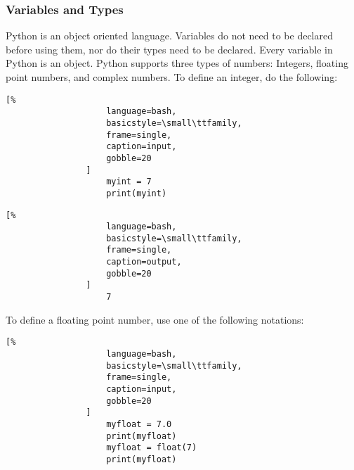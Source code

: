 \documentclass[crop=false,class=article,oneside]{standalone}
\begin{document}
        \subsubsection{Variables and Types}
            Python is an object oriented language.
            Variables do not need to be declared before using them,
            nor do their types need to be declared.
            Every variable in Python is an object.
            Python supports three types of numbers: Integers,
            floating point numbers, and complex numbers.
            To define an integer, do the following:\newline
            \begin{minipage}[t]{.48\textwidth}
                \centering
                \begin{lstlisting}[%
                    language=bash,
                    basicstyle=\small\ttfamily,
                    frame=single,
                    caption=input,
                    gobble=20
                ]
                    myint = 7
                    print(myint)
                \end{lstlisting}
            \end{minipage}
            \hfill
            \begin{minipage}[t]{.48\textwidth}
                \centering
                \begin{lstlisting}[%
                    language=bash,
                    basicstyle=\small\ttfamily,
                    frame=single,
                    caption=output,
                    gobble=20
                ]
                    7
                \end{lstlisting}
            \end{minipage}\newline
            To define a floating point number, use one of the
            following notations:
            \newline
            \begin{minipage}[t]{.48\textwidth}
                \centering
                \begin{lstlisting}[%
                    language=bash,
                    basicstyle=\small\ttfamily,
                    frame=single,
                    caption=input,
                    gobble=20
                ]
                    myfloat = 7.0
                    print(myfloat)
                    myfloat = float(7)
                    print(myfloat)
                \end{lstlisting}
            \end{minipage}
\end{document}
